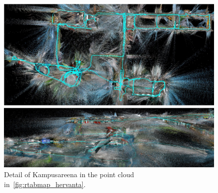 \documentclass[11pt, letterpaper, twoside]{article}
\begin{document}
\begin{figure}[tb]
    \centering

    \includegraphics[width=\textwidth]{rtabmap_hervanta.png}
    \caption{%
        Point cloud of four buildings in Hervanta Campus
        (\cref{fig:campus_map}), generated with \gls{rtabmap}.
    }\label{fig:rtabmap_hervanta}

    \vspace{1em}

    \includegraphics[width=\textwidth]{rtabmap_hervanta_detail.png}
    \caption{%
        Detail of Kampusareena in the point cloud in~\cref{fig:rtabmap_hervanta}.
    }\label{fig:rtabmap_hervanta_detail}

    \vspace{1em}


\end{figure}
\end{document}
